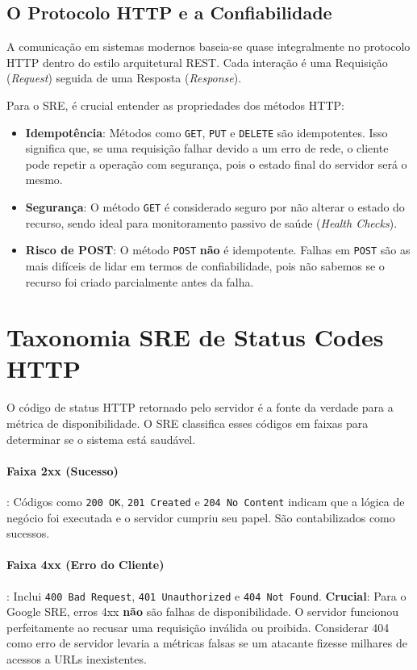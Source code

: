 \documentclass[12pt,a4paper]{report}
\begin{document}
\subsection{O Protocolo HTTP e a Confiabilidade}

A comunicação em sistemas modernos baseia-se quase integralmente no protocolo HTTP dentro do estilo arquitetural REST. Cada interação é uma Requisição (\textit{Request}) seguida de uma Resposta (\textit{Response}).

Para o SRE, é crucial entender as propriedades dos métodos HTTP:
\begin{itemize}
    \item \textbf{Idempotência}: Métodos como \texttt{GET}, \texttt{PUT} e \texttt{DELETE} são idempotentes. Isso significa que, se uma requisição falhar devido a um erro de rede, o cliente pode repetir a operação com segurança, pois o estado final do servidor será o mesmo.
    \item \textbf{Segurança}: O método \texttt{GET} é considerado seguro por não alterar o estado do recurso, sendo ideal para monitoramento passivo de saúde (\textit{Health Checks}).
    \item \textbf{Risco de POST}: O método \texttt{POST} \textbf{não} é idempotente. Falhas em \texttt{POST} são as mais difíceis de lidar em termos de confiabilidade, pois não sabemos se o recurso foi criado parcialmente antes da falha.
\end{itemize}

\section{Taxonomia SRE de Status Codes HTTP}

O código de status HTTP retornado pelo servidor é a fonte da verdade para a métrica de disponibilidade. O SRE classifica esses códigos em faixas para determinar se o sistema está saudável.

\paragraph{Faixa 2xx (Sucesso)}: Códigos como \texttt{200 OK}, \texttt{201 Created} e \texttt{204 No Content} indicam que a lógica de negócio foi executada e o servidor cumpriu seu papel. São contabilizados como sucessos.

\paragraph{Faixa 4xx (Erro do Cliente)}: Inclui \texttt{400 Bad Request}, \texttt{401 Unauthorized} e \texttt{404 Not Found}. \textbf{Crucial}: Para o Google SRE, erros 4xx \textbf{não} são falhas de disponibilidade. O servidor funcionou perfeitamente ao recusar uma requisição inválida ou proibida. Considerar 404 como erro de servidor levaria a métricas falsas se um atacante fizesse milhares de acessos a URLs inexistentes.
\end{document}
